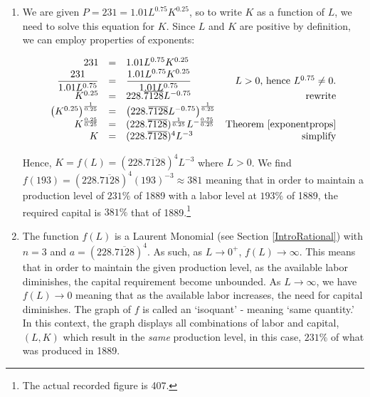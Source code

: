 \documentclass{ximera}
\begin{document}
\begin{example}
\begin{enumerate}
\item We are given $P = 231 = 1.01L^{0.75} K^{0.25}$, so to write $K$ as a function of $L$, we need to solve this equation for $K$.  Since $L$ and $K$ are positive by definition, we can employ properties of exponents:

\[ \begin{array}{rclr}

231 & = & 1.01 L^{0.75} K^{0.25} & \\

\dfrac{231}{1.01 L^{0.75}} & = &  \dfrac{1.01 L^{0.75} K^{0.25}}{1.01 L^{0.75}} & \text{$L>0$, hence $L^{0.75} \neq 0$.}\\

K^{0.25} & = & 228.\overline{7128}L^{-0.75} & \text{rewrite} \\

\left(K^{0.25}\right)^{\frac{1}{0.25}} & = & \left(228.\overline{7128}L^{-0.75}\right)^{\frac{1}{0.25}} & \\

K^{\frac{0.25}{0.25}} & = & (228.\overline{7128})^{\frac{1}{0.25}} L^{-\frac{0.75}{0.25}} & \text{Theorem  \ref{exponentprops}} \\

K & = &  (228.\overline{7128})^{4} L^{-3} & \text{simplify} \\ \end{array} \]

Hence, $K = f(L) =  (228.\overline{7128})^{4} L^{-3}$ where $L>0$.  We find $f(193) =  (228.\overline{7128})^{4} (193)^{-3} \approx 381$ meaning that in order to maintain a production level of $231 \%$ of 1889 with a labor level at $193 \%$ of 1889, the required capital is $381 \%$ that of 1889.\footnote{The actual recorded figure is 407.}

\item The function $f(L)$ is a Laurent Monomial (see Section \ref{IntroRational}) with $n = 3$ and $a = (228.\overline{7128})^{4}$.  As such, as $L \rightarrow 0^{+}$, $f(L) \rightarrow \infty$.  This means that in order to maintain the given production level, as the available labor diminishes, the capital requirement become unbounded.  As $L \rightarrow \infty$, we have $f(L) \rightarrow 0$ meaning that as the available labor increases, the need for capital diminishes.  The graph of $f$ is called an `isoquant' - meaning `same quantity.'  In this context, the graph displays all combinations of labor and capital, $(L,K)$  which result in the \textit{same} production level, in this case, $231 \%$ of what was produced in 1889.


\end{enumerate}
\end{example}
\end{document}
